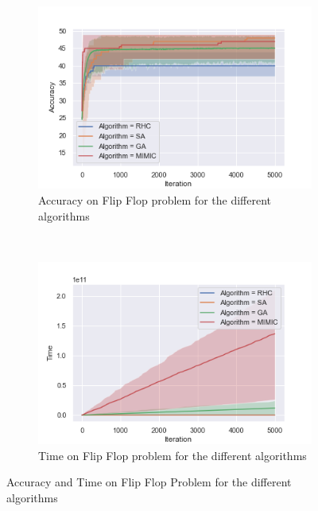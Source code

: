 \documentclass[10pt]{article}
\begin{document}
				\begin{figure}[h]
					\centering
					\begin{subfigure}[t]{0.45\columnwidth}
						\centering
						\includegraphics[width=\linewidth]{../graphics/flip_flop_all_Iteration_Error_Algorithm.png}
						\caption{Accuracy on Flip Flop problem for the different algorithms}
						\label{ff:all_accuracy}
					\end{subfigure}
					~
					\begin{subfigure}[t]{0.45\columnwidth}
						\centering
						\includegraphics[width=\linewidth]{../graphics/flip_flop_all_Iteration_Time_Algorithm.png}
						\caption{Time on Flip Flop problem for the different algorithms}
						\label{ff:all_time}
					\end{subfigure}
					\caption{Accuracy and Time on Flip Flop Problem for the different algorithms}
					\label{ff:all}
				\end{figure}
\end{document}
